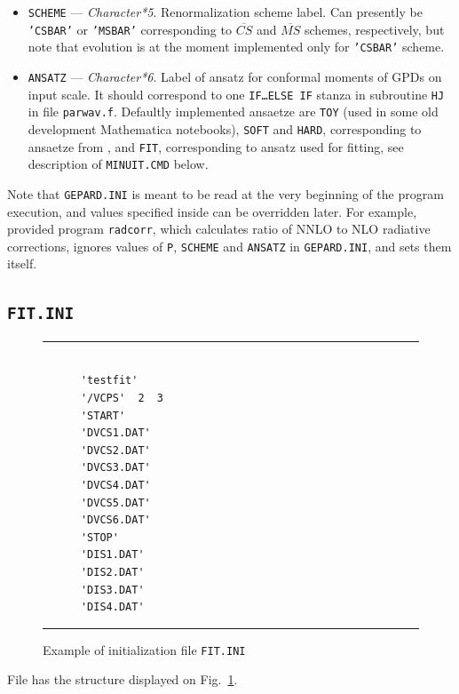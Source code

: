 \documentclass[12pt]{article}
\begin{document}
\begin{itemize}
\item
\texttt{SCHEME} --- \emph{Character*5}. Renormalization scheme label. Can presently be \texttt{'CSBAR'} or
\texttt{'MSBAR'} corresponding to $\overline{CS}$ and $\overline{MS}$ schemes, respectively,
but note that evolution is at the moment implemented only for \texttt{'CSBAR'} scheme.

\item
\texttt{ANSATZ} --- \emph{Character*6}. Label of ansatz for conformal moments of GPDs on input scale. 
It should correspond to one  \texttt{IF\ldots ELSE IF} stanza in subroutine
\texttt{HJ} in file \texttt{parwav.f}. Defaultly implemented ansaetze are
\texttt{TOY} (used in some old development Mathematica notebooks), \texttt{SOFT} and \texttt{HARD},
corresponding to ansaetze from \cite{Kumericki:2006xx}, and \texttt{FIT}, corresponding
to ansatz used for fitting, see description of \texttt{MINUIT.CMD} below.

\end{itemize}

Note that \texttt{GEPARD.INI} is meant to be read at the very beginning of the
program execution, and values specified inside can be overridden later. For
example, provided program \texttt{radcorr}, which calculates ratio of NNLO to NLO
radiative corrections, ignores values of \texttt{P}, \texttt{SCHEME} and
\texttt{ANSATZ} in \texttt{GEPARD.INI}, and sets them itself.


\subsection{\texttt{FIT.INI}}

\begin{figure}[t]
\begin{center}
\hrule
\begin{verbatim}

      'testfit'
      '/VCPS'  2  3
      'START'
      'DVCS1.DAT'
      'DVCS2.DAT'
      'DVCS3.DAT'
      'DVCS4.DAT'
      'DVCS5.DAT'
      'DVCS6.DAT'
      'STOP'
      'DIS1.DAT'
      'DIS2.DAT'
      'DIS3.DAT'
      'DIS4.DAT'

\end{verbatim}
\hrule
\end{center}
\caption{Example of initialization file \texttt{FIT.INI}}
\label{fig:FIT.INI}
\end{figure}

File has the structure displayed on Fig.~\ref{fig:FIT.INI}.
\end{document}
